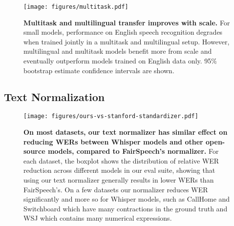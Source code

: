 \documentclass[nohyperref]{article}
\theoremstyle{plain}
\theoremstyle{definition}
\theoremstyle{remark}
\begin{document}
\begin{figure}[t]
\begin{center}
\centerline{\texttt{[image: figures/multitask.pdf]}}
\caption{\textbf{Multitask and multilingual transfer improves with scale.} For small models, performance on English speech recognition degrades when trained jointly in a multitask and multilingual setup. However, multilingual and multitask models benefit more from scale and eventually outperform models trained on English data only. 95\% bootstrap estimate confidence intervals are shown.}
\label{multilingual_multitask_transfer}
\end{center}
\vspace{-1em}
\end{figure}


\subsection{Text Normalization}\label{subsec:text-normalization-analysis}

\begin{figure}[t]
\begin{center}
\centerline{\texttt{[image: figures/ours-vs-stanford-standardizer.pdf]}}
\caption{\textbf{On most datasets, our text normalizer has similar effect on reducing WERs between Whisper models and other open-source models, compared to FairSpeech's normalizer.} For each dataset, the boxplot shows the distribution of relative WER reduction across different models in our eval suite, showing that using our text normalizer generally results in lower WERs than FairSpeech's. On a few datasets our normalizer reduces WER significantly and more so for Whisper models, such as CallHome and Switchboard which have many contractions in the ground truth and WSJ which contains many numerical expressions.}
\label{fig:text_normalizer}
\end{center}
\vspace{-2em}
\end{figure}
\end{document}
